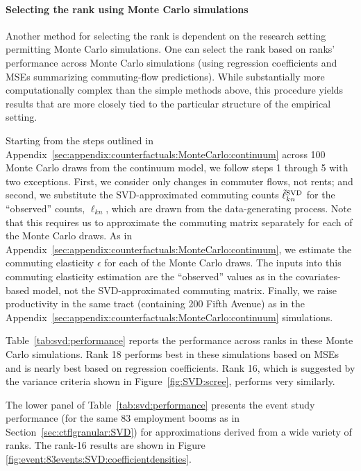 \documentclass[11pt]{article}
\theoremstyle{definition}
\begin{document}
\paragraph{Selecting the rank using Monte Carlo simulations}
Another method for selecting the rank is dependent on the research setting permitting Monte Carlo simulations.
One can select the rank based on ranks' performance across Monte Carlo simulations
(using regression coefficients and MSEs summarizing commuting-flow predictions).
While substantially more computationally complex than the simple methods above,
this procedure yields results that are more closely tied to the particular structure of the empirical setting.

Starting from the steps outlined in Appendix~\ref{sec:appendix:counterfactuals:MonteCarlo:continuum} across 100 Monte Carlo draws from the continuum model, we follow steps 1 through 5 with two exceptions.
First, we consider only changes in commuter flows, not rents; and second, we substitute the SVD-approximated commuting counts \(\Tilde{\ell}_{kn}^\mathrm{SVD}\) for the ``observed'' counts, \(\ell_{kn}\), which are drawn from the data-generating process.
Note that this requires us to approximate the commuting matrix separately for each of the Monte Carlo draws.
As in Appendix~\ref{sec:appendix:counterfactuals:MonteCarlo:continuum}, we estimate the commuting elasticity \(\epsilon\) for each of the Monte Carlo draws.
The inputs into this commuting elasticity estimation are the ``observed'' values as in the covariates-based model, not the SVD-approximated commuting matrix.
Finally, we raise productivity in the same tract (containing 200 Fifth Avenue) as in the Appendix~\ref{sec:appendix:counterfactuals:MonteCarlo:continuum} simulations.

Table~\ref{tab:svd:performance} reports the performance across ranks in these Monte Carlo simulations. 
Rank 18 performs best in these simulations based on MSEs and is nearly best based on regression coefficients.
Rank 16, which is suggested by the variance criteria shown in Figure~\ref{fig:SVD:scree}, performs very similarly.

The lower panel of Table~\ref{tab:svd:performance} presents the event study performance 
(for the same 83 employment booms as in Section~\ref{sec:ctflgranular:SVD})
for approximations derived from a wide variety of ranks.
The rank-16 results are shown in Figure \ref{fig:event:83events:SVD:coefficientdensities}.

\FloatBarrier 
\end{document}
